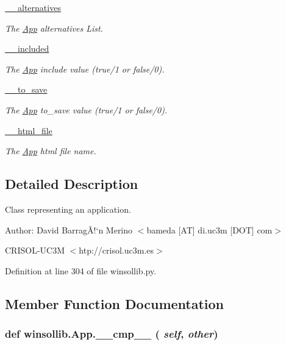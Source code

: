 \begin{CompactItemize}
\hyperlink{classwinsollib_1_1App_c1d444b0231d2ba86a08617d1453d805}{\_\-\_\-alternatives}
\begin{CompactList}\small\item\em The \hyperlink{classwinsollib_1_1App}{App} alternatives List. \item\end{CompactList}\item 
\hyperlink{classwinsollib_1_1App_20a0fca37c2b4af23ff9e3201b3a3fc2}{\_\-\_\-included}
\begin{CompactList}\small\item\em The \hyperlink{classwinsollib_1_1App}{App} include value ({\em true/1\/} or {\em false/0\/}). \item\end{CompactList}\item 
\hyperlink{classwinsollib_1_1App_1b9a7516516f0040a2f374609d7ecfc6}{\_\-\_\-to\_\-save}
\begin{CompactList}\small\item\em The \hyperlink{classwinsollib_1_1App}{App} to\_\-save value ({\em true/1\/} or {\em false/0\/}). \item\end{CompactList}\item 
\hyperlink{classwinsollib_1_1App_487c1a60b7223a7c5e1d43cb7ad2ab90}{\_\-\_\-html\_\-file}
\begin{CompactList}\small\item\em The \hyperlink{classwinsollib_1_1App}{App} html file name. \item\end{CompactList}\end{CompactItemize}


\subsection{Detailed Description}
Class representing an application. 

\begin{Desc}
\item[Author:]David Barrag\~{A}!`n Merino $<$bameda \mbox{[}AT\mbox{]} di.uc3m \mbox{[}DOT\mbox{]} com$>$ 

CRISOL-UC3M $<$htp://crisol.uc3m.es$>$ \end{Desc}




Definition at line 304 of file winsollib.py.

\subsection{Member Function Documentation}
\hypertarget{classwinsollib_1_1App_fd54ebb58d1409642f9b649767d6322a}{
\subsubsection[\_\-\_\-cmp\_\-\_\-]{\setlength{\rightskip}{0pt plus 5cm}def winsollib.App.\_\-\_\-cmp\_\-\_\- ( {\em self},  {\em other})}}
\label{classwinsollib_1_1App_fd54ebb58d1409642f9b649767d6322a}


